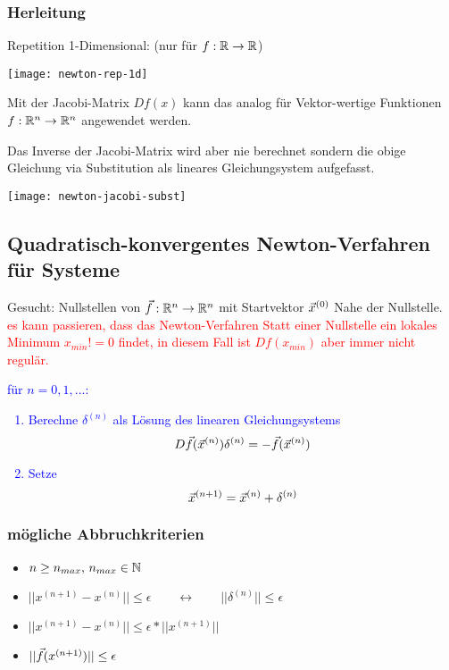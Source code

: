 \subsubsection{Herleitung}

Repetition 1-Dimensional: (nur für $f: \mathbb{R} \to \mathbb{R}$)

\texttt{[image: newton-rep-1d]}


Mit der Jacobi-Matrix $Df(x)$ kann das analog für Vektor-wertige
Funktionen $f: \mathbb{R}^n \to \mathbb{R}^n$ angewendet werden.

\begin{center}
\end{center}


Das Inverse der Jacobi-Matrix wird aber nie berechnet sondern die obige Gleichung
via Substitution als lineares Gleichungsystem aufgefasst.

\texttt{[image: newton-jacobi-subst]}





\subsection{Quadratisch-konvergentes Newton-Verfahren für Systeme}

Gesucht: Nullstellen von $\vec f : \mathbb{R}^n \to \mathbb{R}^n$ mit Startvektor $\vec x^{(0)}$
Nahe der Nullstelle.\\
\textcolor{red}{es kann passieren, dass das Newton-Verfahren Statt einer Nullstelle
	ein lokales Minimum $x_{min} != 0$ findet, in diesem Fall ist $Df(x_{min})$
	aber immer nicht regulär.}

\textcolor{blue}{
	\Large{
		für $n = 0, 1,...$:
		\begin{enumerate}
			\item Berechne $\delta^{(n)}$ als Lösung des linearen Gleichungsystems
			      $$ D\vec{f}(\vec x^{(n)}) \delta^{(n)} = - \vec f(\vec x^{(n)}) $$
			\item Setze
			      $$ \vec x^{(n+1)} = \vec x^{(n)} + \delta^{(n)} $$
		\end{enumerate}
	}
}

\subsubsection{mögliche Abbruchkriterien}

\begin{itemize}
	\item $n \ge n_{max}, \, n_{max} \in \mathbb{N}$
	\item $|| x^{(n+1)} - x^{(n)} || \le \epsilon
		      \qquad \leftrightarrow \qquad || \delta^{(n)} || \le \epsilon$
	\item $|| x^{(n+1)} - x^{(n)} || \le \epsilon * || x^{(n+1)} ||$
	\item $|| \vec f(x^{(n+1)}) || \le \epsilon$
\end{itemize}

